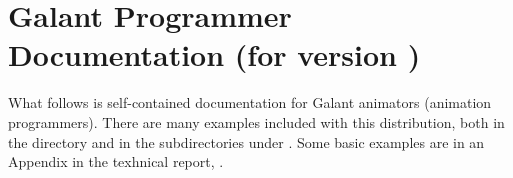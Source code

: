 \documentclass{article}
\begin{document}
\section{Galant Programmer Documentation (for version \VERSION)}

What follows is self-contained documentation for Galant animators (animation
programmers). There are many examples included with this distribution, both
in the  directory and in the subdirectories under
. Some basic examples are in an Appendix in the texhnical
report, .

\tableofcontents

\listoftables

\newpage


\end{document}
